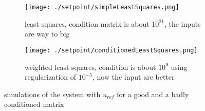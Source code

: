 \begin{figure}[H]
	\centering
	\begin{subfigure}[b]{0.45\textwidth}
		\texttt{[image: ./setpoint/simpleLeastSquares.png]}
		\caption{least squares, condition matrix is about $10^{21}$, the inputs are way to big}
		\label{fig:least square opti simulation}
	\end{subfigure}
	\begin{subfigure}[b]{0.45\textwidth}
		\texttt{[image: ./setpoint/conditionedLeastSquares.png]}
		\caption{weighted least squares, condition is about $10^{9}$ using regularization of $10^{-5}$, now the input are better}
		\label{fig:least square opti simulation, better condition}
	\end{subfigure}
	\caption{simulations of the system with $u_{ref}$ for a good and a badly conditioned matrix}
\end{figure}
